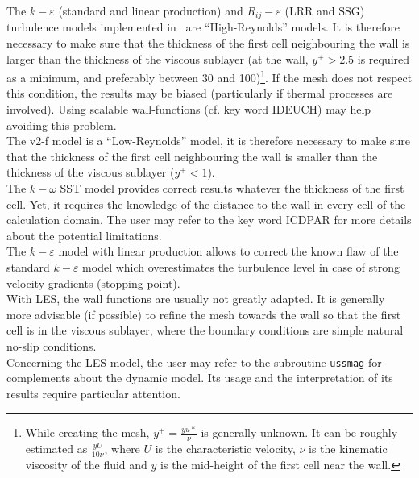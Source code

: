 The $k-\varepsilon$ (standard and linear production) and $R_{ij}-\varepsilon$
(LRR and SSG) turbulence
models implemented in \CS\ are ``High-Reynolds'' models. It is therefore
necessary to make sure that the thickness of the first cell neighbouring
the wall is larger than the thickness of the viscous sublayer (at the
wall, $y^+>2.5$ is required as a minimum, and preferably between 30 and
100)\footnote{While creating the mesh, $y^+=\frac{yu*}{\nu}$ is
generally unknown. It can be roughly estimated as $\frac{yU}{10\nu}$, where 
$U$ is the characteristic velocity, $\nu$ is the kinematic viscosity of the fluid
 and $y$ is the mid-height of the first cell near the wall.}. If the mesh does
 not respect this condition, the results may be biased
(particularly if thermal processes are involved). Using scalable wall-functions
(cf. key word IDEUCH) may help avoiding this problem.\\
The v2-f model is a ``Low-Reynolds'' model, it is therefore necessary to
make sure that the thickness of the first cell neighbouring the wall is
smaller than the thickness of the viscous sublayer ($y^+<1$).\\
The $k-\omega$ SST model provides correct results whatever the thickness of the first cell.
Yet, it requires the knowledge of the distance to the wall in every
cell of the calculation domain. The user may refer to the key word
ICDPAR for more details about the potential limitations.\\
The $k-\varepsilon$ model with linear production allows to correct the
known flaw of the standard $k-\varepsilon$ model which overestimates the
turbulence level in case of strong velocity gradients (stopping point).\\
With LES, the wall functions are usually not greatly adapted. It is generally more advisable
(if possible) to refine the mesh towards the wall so that the first cell is in the
viscous sublayer, where the boundary conditions are simple natural no-slip conditions.\\
Concerning the LES model, the user may refer to the subroutine
\texttt{ussmag} for complements about the dynamic model. Its usage
and the interpretation of its results require particular attention.\\

